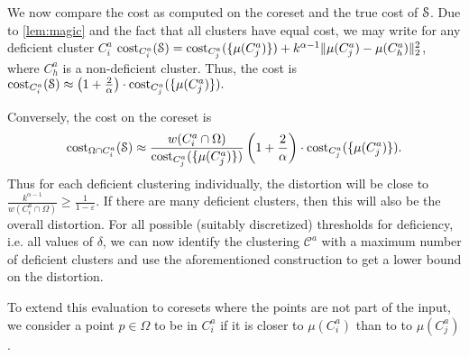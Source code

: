 We now compare the cost as computed on the coreset and the true cost of $\mathcal{S}$. Due to \cref{lem:magic} and the fact that all clusters have equal cost, we may write for any deficient cluster $C_i^a$
$\text{cost}_{C_i^a}(\mathcal{S}) = \text{cost}_{C_j^a}(\{\mu(C_j^a)\}) + k^{\alpha-1}\|\mu(C_j^a)-\mu(C_h^a)\|_2^2$, where $C_h^a$ is a non-deficient cluster.
Thus, the cost is $\text{cost}_{C_i^a}(\mathcal{S}) \approx \left(1+\frac{2}{\alpha}\right)\cdot \text{cost}_{C_j^a}(\{\mu(C_j^a)\}).$

Conversely, the cost on the coreset is 
\begin{align*}
\text{cost}_{\Omega\cap C_i^a}(\mathcal{S})  
 \approx  \frac{w(C_i^a \cap \Omega)}{ \text{cost}_{C_j^a}(\{\mu(C_j^a)\})}\left(1+\frac{2}{\alpha}\right)\cdot \text{cost}_{C_j^a}(\{\mu(C_j^a)\}).
\end{align*}
Thus for each deficient clustering individually, the distortion will be close to $\frac{k^{\alpha-1}}{w(C_i^a \cap \Omega)} \geq \frac{1}{1-\varepsilon}$.
If there are many deficient clusters, then this will also be the overall distortion.
For all possible (suitably discretized) thresholds for deficiency, i.e. all values of $\delta$, we can now identify the clustering $\mathcal{C}^a$ with a maximum number of deficient clusters and use the aforementioned construction to get a lower bound on the distortion.

To extend this evaluation to coresets where the points are not part of the input, we consider a point $p\in \Omega$ to be in $C_i^a$ if it is closer to $\mu(C_i^a)$ than to to $\mu(C_j^a)$.


